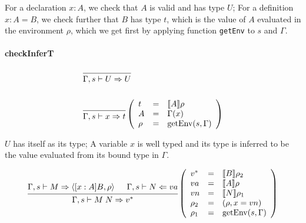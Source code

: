 \documentclass{article}
\theoremstyle{remark}
\begin{document}
For a declaration $x : A$, we check that $A$ is valid and has type $U$; For a definition $x : A = B$, we check further that $B$ has type $t$, which is the value of $A$ evaluated in the environment $\rho$, which we get first by applying function \texttt{getEnv} to $s$ and $\Gamma$. 

\paragraph{checkInferT}
\begin{align}
  &\begin{prooftree}
    \infer0{\Gamma,s \vdash U \Rightarrow U}
  \end{prooftree} \\
  \nonumber \\
  &\begin{prooftree}
    \infer0{\Gamma,s \vdash x \Rightarrow t}
  \end{prooftree}\left(\begin{array}{l l l}
                         t & = & \llbracket A \rrbracket \rho \\
                         A & = & \Gamma(x) \\
                         \rho & = & \text{getEnv}(s, \Gamma)
                       \end{array}\right)
\end{align}

$U$ has itself as its type; A variable $x$ is well typed and its type is inferred to be the value evaluated from its bound type in $\Gamma$.

\begin{align}
  \begin{prooftree}
    \hypo{\Gamma,s \vdash M \Rightarrow \langle [x : A] B, \rho \rangle}
    \hypo{\Gamma,s \vdash N \Leftarrow va}
    \infer2{\Gamma,s \vdash M \; N \Rightarrow v^*}
  \end{prooftree}\left(\begin{array}{l l l}
                         v^* & = & \llbracket B \rrbracket \rho_2\\
                         va & = & \llbracket A \rrbracket \rho \\
                         vn & = & \llbracket N \rrbracket \rho_1 \\
                         \rho_2 &= & (\rho, x = vn) \\
                         \rho_1 &= & \text{getEnv}(s, \Gamma)
                       \end{array}\right)
\end{align}
\end{document}
